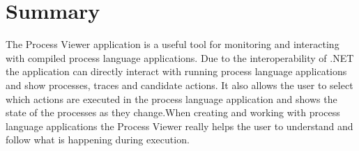 	

\section{Summary}

	The Process Viewer application is a useful tool for monitoring and 
	interacting with compiled process language applications. Due to the 
	interoperability of .NET the application can directly interact with running 
	process language applications and show processes, traces and candidate 
	actions. It also allows the user to select which actions are executed in the 
	process language application and shows the state of the processes as they 
	change.When creating and working with process language applications the 
	Process Viewer really helps the user to understand and follow what is 
	happening during execution.